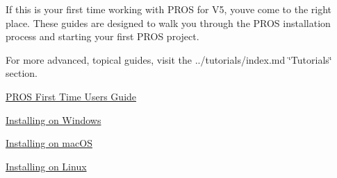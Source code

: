 If this is your first time working with P\+R\+OS for V5, you\textquotesingle{}ve come to the right place. These guides are designed to walk you through the P\+R\+OS installation process and starting your first P\+R\+OS project.

For more advanced, topical guides, visit the ../tutorials/index.md \char`\"{}\+Tutorials\char`\"{} section.


\begin{DoxyItemize}
\item \hyperlink{new-users_8md}{P\+R\+OS First Time Users Guide}
\end{DoxyItemize}


\begin{DoxyItemize}
\item \hyperlink{windows_8md}{Installing on Windows}
\item \hyperlink{macos_8md}{Installing on mac\+OS}
\item \hyperlink{linux_8md}{Installing on Linux} 
\end{DoxyItemize}